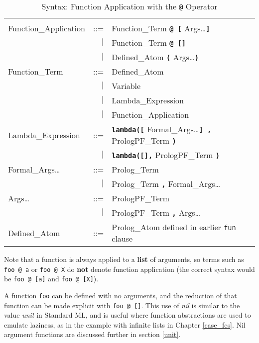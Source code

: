 \begin{table}[htbp]
{\small
\begin{tabular}{| l r l |}
\hline
 & & \\[2mm]
Function\_{}Application & ::= & Function\_{}Term \texttt{\textbf{@ [}} Args\ldots \texttt{\textbf{]}}\\
 & $|$ & Function\_{}Term \texttt{\textbf{@ []}}\\
 & $|$ & Defined\_{}Atom \texttt{\textbf{(}} Args\ldots \texttt{\textbf{)}}\\[4mm]
Function\_{}Term & ::= & Defined\_{}Atom\\
 & $|$ & Variable\\
 & $|$ & Lambda\_{}Expression\\
 & $|$ & Function\_{}Application\\[4mm]
Lambda\_{}Expression & ::= & \texttt{\textbf{lambda([}} Formal\_{}Args\ldots \texttt{\textbf{] ,}}
                                PrologPF\_{}Term \texttt{\textbf{)}}\\
 & $|$ & \texttt{\textbf{lambda([],}} PrologPF\_{}Term \texttt{\textbf{)}}\\[4mm]
Formal\_{}Args\ldots & ::= & Prolog\_{}Term\\
 & $|$ & Prolog\_{}Term \texttt{\textbf{,}} Formal\_{}Args\ldots\\[4mm]
Args\ldots & ::= & PrologPF\_{}Term\\
 & $|$ & PrologPF\_{}Term \texttt{\textbf{,}} Args\ldots\\[4mm]
Defined\_{}Atom & ::= & Prolog\_{}Atom defined in earlier \texttt{fun} clause\\
\hline
\end{tabular}
}
\caption{Syntax: Function Application with the \texttt{@} Operator}
\label{syntax:application}
\end{table}

Note that a function is always applied to a \textbf{list} of arguments,
so terms such as
\texttt{foo @ a} or \texttt{foo @ X}
do \textbf{not} denote function application (the correct syntax would be
\texttt{foo @ [a]} and \texttt{foo @ [X]}).

A function \texttt{foo} can be
defined with no arguments, and the reduction of that function can be made
explicit with \texttt{foo @ []}.  This use of \textit{nil} is similar to
the value \textit{unit} in Standard ML, and is useful where function
abstractions are used to emulate laziness, as in the example with infinite
lists in Chapter \ref{case_fcs}.  Nil argument functions are
discussed further in section
\ref{unit}.

